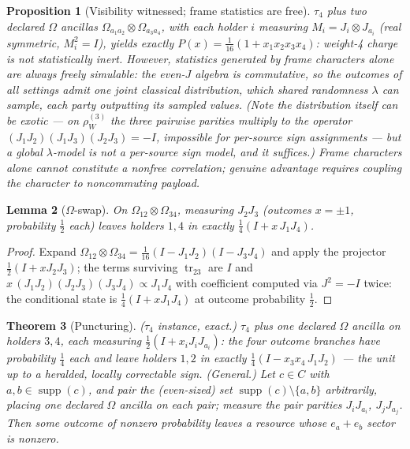 \documentclass[11pt]{article}
\theoremstyle{plain}
\newtheorem{theorem}{Theorem}[section]
\newtheorem{lemma}[theorem]{Lemma}
\newtheorem{proposition}[theorem]{Proposition}
\theoremstyle{definition}
\theoremstyle{remark}
\theoremstyle{plain}
\newcommand{\tr}{\operatorname{tr}}
\newcommand{\Om}{\Omega}
\newcommand{\supp}{\operatorname{supp}}
\begin{document}
\begin{proposition}[Visibility witnessed; frame statistics are
free]\label{prop:abelian}
$\tau_4$ plus two declared $\Om$ ancillas
$\Om_{a_1a_2}\otimes\Om_{a_3a_4}$, with each holder $i$ measuring
$M_i = J_i\otimes J_{a_i}$ (real symmetric, $M_i^2 = I$), yields
exactly $P(x) = \tfrac1{16}(1+x_1x_2x_3x_4)$: weight-4 charge is
not statistically inert. However, statistics generated by frame
characters alone are always freely simulable: the even-$J$ algebra
is commutative, so the outcomes of \emph{all} settings admit one
joint classical distribution, which shared randomness $\lambda$
can sample, each party outputting its sampled values. (Note the
distribution itself can be exotic --- on $\rho^{(3)}_W$ the three
pairwise parities multiply to the operator
$(J_1J_2)(J_1J_3)(J_2J_3) = -I$, impossible for per-source sign
assignments --- but a global $\lambda$-model is not a per-source
sign model, and it suffices.) \emph{Frame characters alone cannot
constitute a nonfree correlation; genuine advantage requires
coupling the character to noncommuting payload.}
\end{proposition}

\begin{lemma}[$\Om$-swap]\label{lem:swap}
On $\Om_{12}\otimes\Om_{34}$, measuring $J_2J_3$ (outcomes
$x = \pm1$, probability $\tfrac12$ each) leaves holders $1,4$ in
exactly $\tfrac14(I + x\,J_1J_4)$.
\end{lemma}

\begin{proof}
Expand $\Om_{12}\otimes\Om_{34} = \tfrac1{16}(I - J_1J_2)(I -
J_3J_4)$ and apply the projector $\tfrac12(I + xJ_2J_3)$; the
terms surviving $\tr_{23}$ are $I$ and
$x\,(J_1J_2)(J_2J_3)(J_3J_4)\propto J_1J_4$ with coefficient
computed via $J^2 = -I$ twice: the conditional state is
$\tfrac14(I + xJ_1J_4)$ at outcome probability $\tfrac12$.
\end{proof}

\begin{theorem}[Puncturing]\label{thm:puncture}
(\emph{$\tau_4$ instance, exact.}) $\tau_4$ plus one declared
$\Om$ ancilla on holders $3,4$, each measuring
$\tfrac12(I + x_iJ_iJ_{a_i})$: the four outcome branches have
probability $\tfrac14$ each and leave holders $1,2$ in exactly
$\tfrac14(I - x_3x_4\,J_1J_2)$ --- the unit up to a heralded,
locally correctable sign. (\emph{General.}) Let $c\in C$ with
$a,b\in\supp(c)$, and pair the (even-sized) set
$\supp(c)\setminus\{a,b\}$ arbitrarily, placing one declared
$\Om$ ancilla on each pair; measure the pair parities
$J_iJ_{a_i}$, $J_jJ_{a_j}$. Then some outcome of nonzero
probability leaves a resource whose $e_a+e_b$ sector is nonzero.
\end{theorem}
\end{document}
